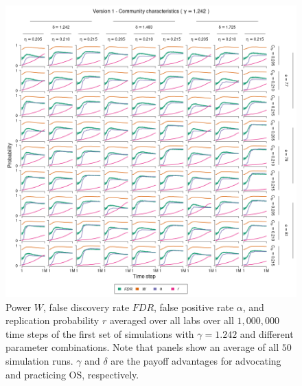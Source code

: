 \documentclass[meta, authordate]{jote-new-article}
\begin{document}
\begin{figure}
  \begin{fullwidth}
    \centering
    \includegraphics[width=\textwidth]{v1_cha_plot_sens_payypro1.242.png}
    \caption{Power $W$, false discovery rate $FDR$, false positive rate $\alpha$, and replication probability $r$ averaged over all labs over all $1,000,000$ time steps of the first set of simulations with $\gamma=1.242$ and different parameter combinations. Note that panels show an average of all $50$ simulation runs. $\gamma$ and $\delta$ are the payoff advantages for advocating and practicing OS, respectively.}
    \label{fig:v1_cha_plot_sens_payypro1.242}
  \end{fullwidth}
\end{figure}
%
%
\end{document}
